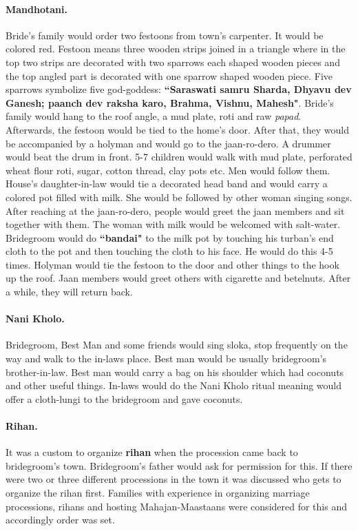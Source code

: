 \paragraph{Mandhotani.} Bride's family would order two festoons from town's
carpenter. It would be colored red. Festoon means three wooden strips joined in
a triangle where in the top two strips are decorated with two sparrows each
shaped wooden pieces and the top angled part is decorated with one sparrow
shaped wooden piece. Five sparrows symbolize five god-goddess:
\textbf{``Saraswati samru Sharda, Dhyavu dev Ganesh; paanch dev raksha karo,
Brahma, Vishnu, Mahesh"}. Bride's family would hang to the roof angle, a mud
plate, roti and raw \textit{papad}. Afterwards, the festoon would be tied to
the home's door. After that, they would be accompanied by a holyman and would
go to the jaan-ro-dero. A drummer would beat the drum in front. 5-7 children
would walk with mud plate, perforated wheat flour roti, sugar, cotton thread,
clay pots etc. Men would follow them. House's daughter-in-law would tie a
decorated head band and would carry a colored pot filled with milk. She would
be followed by other woman singing songs. After reaching at the jaan-ro-dero,
people would greet the jaan members and sit together with them. The woman with
milk would be welcomed with salt-water. Bridegroom would do \textbf{``bandai"} to the
milk pot by touching his turban's end cloth to the pot and then touching the
cloth to his face. He would do this 4-5 times. Holyman would tie the festoon to
the door and other things to the hook up the roof. Jaan members would greet
others with cigarette and betelnuts. After a while, they will return back.

\paragraph{Nani Kholo.} Bridegroom, Best Man and some friends would sing sloka, stop
frequently on the way and walk to the in-laws place. Best man would be usually
bridegroom's brother-in-law. Best man would carry a bag on his shoulder which had
coconuts and other useful things. In-laws would do the Nani Kholo ritual
meaning would offer a cloth-lungi to the bridegroom and gave coconuts.

\paragraph{Rihan.} It was a custom to organize \textbf{rihan} when the
procession came back to bridegroom's town. Bridegroom's father would ask for
permission for this. If there were two or three different processions in the
town it was discussed who gets to organize the rihan first. Families with
experience in organizing marriage processions, rihans and hosting
Mahajan-Maastaans were considered for this and accordingly order was set.

